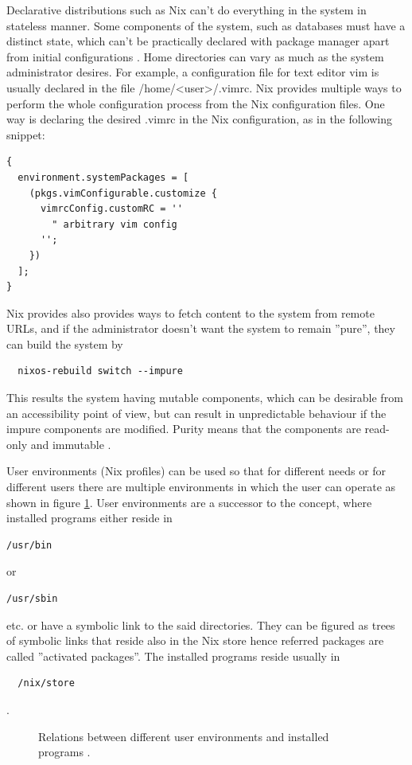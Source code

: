 Declarative distributions such as Nix can't do everything in the
system in stateless manner. Some components of the system, such as
databases must have a distinct state, which can't be practically
declared with package manager apart from initial configurations
\cite{van2013reference}. Home directories can vary as much as the
system administrator desires. For example, a configuration file for
text editor vim is usually declared in the file
/home/<user>/.vimrc. Nix provides multiple ways to perform the whole
configuration process from the Nix configuration files. One way is
declaring the desired .vimrc in the Nix configuration, as in the
following snippet:

\begin{lstlisting}
{
  environment.systemPackages = [
    (pkgs.vimConfigurable.customize {
      vimrcConfig.customRC = ''
        " arbitrary vim config
      '';
    })
  ];
}
\end{lstlisting}
Nix provides also provides ways to fetch content to the system from
remote URLs, and if the administrator doesn't want the system to
remain ''pure'', they can build the system by
\begin{lstlisting}
  nixos-rebuild switch --impure
\end{lstlisting}
This results the system having mutable components, which can be
desirable from an accessibility point of view, but can result in
unpredictable behaviour if the impure components are modified. Purity means that the components are read-only and
immutable \cite{dolstra2010nixos}.

User environments (Nix profiles) can be used so that for different
needs or for different users there are multiple environments in which
the user can operate as shown in figure \ref{userenvs}. User
environments are a successor to the concept, where installed programs
either reside in
\begin{lstlisting}
/usr/bin
\end{lstlisting}
or
\begin{lstlisting}
/usr/sbin
\end{lstlisting}
etc. or have a symbolic link to
the said directories. They can be figured as trees of symbolic links
that reside also in the Nix store hence referred packages are called
''activated packages''. The installed programs reside usually in
\begin{lstlisting}
  /nix/store
\end{lstlisting}. \cite{dolstra2008nixos}

\begin{figure}[t!]
\centerline{}
\caption{Relations between different user environments and installed
  programs \cite{nixosUserEnvironment}.}
\label{userenvs}
\end{figure}

